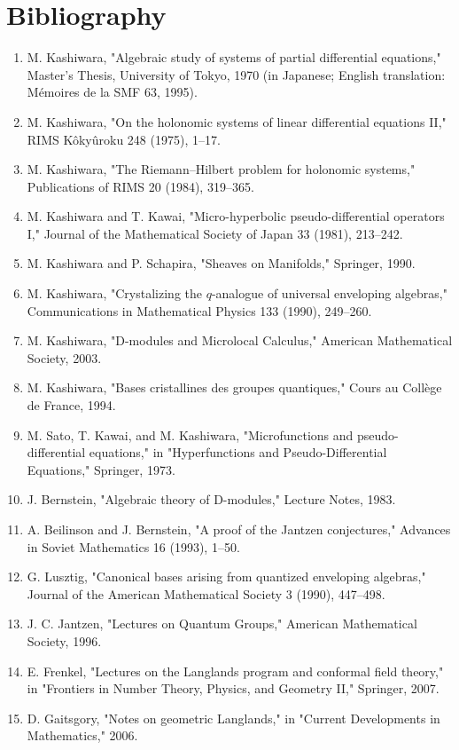 \section*{Bibliography}
\begin{enumerate}
\item M. Kashiwara, "Algebraic study of systems of partial differential equations," Master's Thesis, University of Tokyo, 1970 (in Japanese; English translation: M\'emoires de la SMF 63, 1995).
\item M. Kashiwara, "On the holonomic systems of linear differential equations II," RIMS K\^oky\^uroku 248 (1975), 1--17.
\item M. Kashiwara, "The Riemann--Hilbert problem for holonomic systems," Publications of RIMS 20 (1984), 319--365.
\item M. Kashiwara and T. Kawai, "Micro-hyperbolic pseudo-differential operators I," Journal of the Mathematical Society of Japan 33 (1981), 213--242.
\item M. Kashiwara and P. Schapira, "Sheaves on Manifolds," Springer, 1990.
\item M. Kashiwara, "Crystalizing the $q$-analogue of universal enveloping algebras," Communications in Mathematical Physics 133 (1990), 249--260.
\item M. Kashiwara, "D-modules and Microlocal Calculus," American Mathematical Society, 2003.
\item M. Kashiwara, "Bases cristallines des groupes quantiques," Cours au Coll\`ege de France, 1994.
\item M. Sato, T. Kawai, and M. Kashiwara, "Microfunctions and pseudo-differential equations," in "Hyperfunctions and Pseudo-Differential Equations," Springer, 1973.
\item J. Bernstein, "Algebraic theory of D-modules," Lecture Notes, 1983.
\item A. Beilinson and J. Bernstein, "A proof of the Jantzen conjectures," Advances in Soviet Mathematics 16 (1993), 1--50.
\item G. Lusztig, "Canonical bases arising from quantized enveloping algebras," Journal of the American Mathematical Society 3 (1990), 447--498.
\item J. C. Jantzen, "Lectures on Quantum Groups," American Mathematical Society, 1996.
\item E. Frenkel, "Lectures on the Langlands program and conformal field theory," in "Frontiers in Number Theory, Physics, and Geometry II," Springer, 2007.
\item D. Gaitsgory, "Notes on geometric Langlands," in "Current Developments in Mathematics," 2006.
\end{enumerate}

